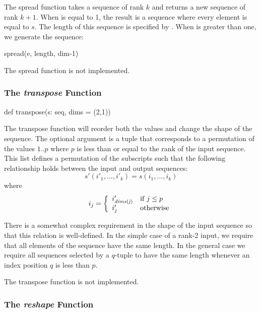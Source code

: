The spread function takes a sequence of rank $k$ and returns a new
sequence of rank $k+1$.  When  is equal to 1, the result is
a sequence where every element is equal to $s$.  The length of this
sequence is specified by .  When  is greater
than one, we generate the sequence:
\begin{chapel}
[e in s] spread(e, length, dim-1)
\end{chapel}

\begin{implementation}
The spread function is not implemented.
\end{implementation}

\subsubsection{The {\em transpose} Function}
\label{The_em_transpose_Function}

\begin{chapel}
def transpose(s: seq, dims = (2,1))
\end{chapel}

The transpose function will reorder both the values and change the
shape of the sequence. The optional  argument is a tuple
that corresponds to a permutation of the values $1..p$ where $p$ is
less than or equal to the rank of the input sequence. This list
defines a permutation of the subscripts such that the following
relationship holds between the input and output sequences:
$$
    s'(i'_1,\ldots,i'_k) = s(i_1,\ldots,i_k)
$$
where
$$
    i_j = \left\{\begin{array}{ll}
                 i'_{\it dims(j)} & \mbox{if $j\le p$}\\
		 i'_j & \mbox{otherwise}
		 \end{array}
          \right.
$$

There is a somewhat complex requirement in the shape of the input
sequence so that this relation is well-defined. In the simple case of
a rank-2 input, we require that all elements of the sequence have the
same length.  In the general case we require all sequences selected by
a $q$-tuple to have the same length whenever an index position $q$ is
less than $p$.

\begin{implementation}
The transpose function is not implemented.
\end{implementation}

\subsubsection{The {\em reshape} Function}
\label{The_em_reshape_Function}

